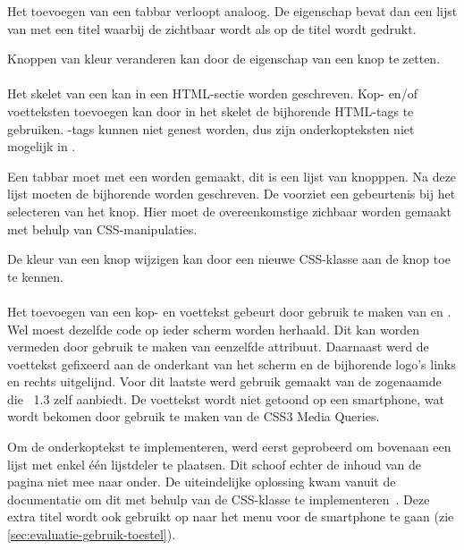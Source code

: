 Het toevoegen van een tabbar verloopt analoog.
De  eigenschap bevat dan een lijst van  met een titel waarbij de  zichtbaar wordt als op de titel wordt gedrukt.

Knoppen van kleur veranderen kan door de  eigenschap van een knop te zetten.

\paragraph{\kendo}
Het skelet van een  kan in een HTML-sectie worden geschreven.
Kop- en/of voetteksten toevoegen kan door in het skelet de bijhorende HTML-tags te gebruiken.
-tags kunnen niet genest worden, dus zijn onderkopteksten niet mogelijk in \kendo{}.

Een tabbar moet met een  worden gemaakt,  dit is een lijst van knopppen.
Na deze lijst moeten de bijhorende  worden geschreven.
De  voorziet een gebeurtenis bij het selecteren van het knop.
Hier moet de overeenkomstige  zichbaar worden gemaakt met behulp van CSS-manipulaties.

De kleur van een knop wijzigen kan door een nieuwe CSS-klasse aan de knop toe te kennen.

\paragraph{\jqm}
Het toevoegen van een kop- en voettekst gebeurt door gebruik te maken van  en . 
Wel moest dezelfde code op ieder scherm worden herhaald. 
Dit kan worden vermeden door gebruik te maken van eenzelfde  attribuut. 
Daarnaast werd de voettekst gefixeerd aan de onderkant van het scherm en de bijhorende logo's links en rechts uitgelijnd. 
Voor dit laatste werd gebruik gemaakt van de zogenaamde  die \jqm{}~1.3 zelf aanbiedt. 
De voettekst wordt niet getoond op een smartphone, wat wordt bekomen door gebruik te maken van de CSS3 Media Queries.

Om de onderkoptekst te implementeren, werd eerst geprobeerd om bovenaan een lijst met enkel één lijstdeler te plaatsen.
Dit schoof echter de inhoud van de pagina niet mee naar onder. 
De uiteindelijke oplossing kwam vanuit de documentatie om dit met behulp van de CSS-klasse  te implementeren~\cite{JQuery2013b}. 
Deze extra titel wordt ook gebruikt op naar het menu voor de smartphone te gaan (zie \ref{sec:evaluatie-gebruik-toestel}).


